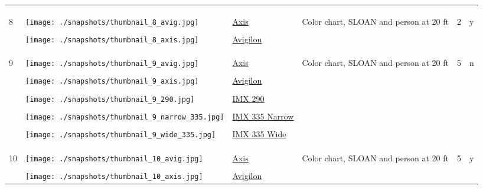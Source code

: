 \documentclass{article}%
\begin{document}
\begin{longtabu}{m{2.5cm} m{4cm} m{2cm} m{4cm} m{2cm} m{2cm}}
&&&&&\\%
&&&&&\\%
\hline%
&&&&&\\%
8&\texttt{[image: ./snapshots/thumbnail\_8\_avig.jpg]}&\href{https://drive.google.com/file/d/1dIMfIvu4PNXc4fBl0NWdB_pRMQ6uOnRl/view?usp=sharing}{Axis}&Color chart, SLOAN and person at 20 ft&2&y\\%
&&&&&\\%
&\texttt{[image: ./snapshots/thumbnail\_8\_axis.jpg]}&\href{https://drive.google.com/file/d/1CdmQ9ZqpQhFciiErRFA1oyzv_LDTw08f/view?usp=sharing}{Avigilon}&&&\\%
&&&&&\\%
&&&&&\\%
\hline%
&&&&&\\%
9&\texttt{[image: ./snapshots/thumbnail\_9\_avig.jpg]}&\href{https://drive.google.com/file/d/1-nkgyYF5XQGoX78rVhqMn-urWQTx7N5H/view?usp=sharing}{Axis}&Color chart, SLOAN and person at 20 ft&5&n\\%
&&&&&\\%
&\texttt{[image: ./snapshots/thumbnail\_9\_axis.jpg]}&\href{https://drive.google.com/file/d/1Wksqn2RFeL8PvKrpSK_-9BojnGTA-myy/view?usp=sharing}{Avigilon}&&&\\%
&&&&&\\%
&\texttt{[image: ./snapshots/thumbnail\_9\_290.jpg]}&\href{https://drive.google.com/file/d/17ozV-Gmt341mVcATrnqn1vQrTIJ5zGFD/view?usp=sharing}{IMX 290}&&&\\%
&&&&&\\%
&\texttt{[image: ./snapshots/thumbnail\_9\_narrow\_335.jpg]}&\href{https://drive.google.com/file/d/1XLKox52boq9CPdTEdJzQeL3ovW9pv7-0/view?usp=sharing}{IMX 335 Narrow}&&&\\%
&&&&&\\%
&\texttt{[image: ./snapshots/thumbnail\_9\_wide\_335.jpg]}&\href{https://drive.google.com/file/d/1JAG3ou_N4E42RGVmzAd49YMlXWBZ0w7z/view?usp=sharing}{IMX 335 Wide}&&&\\%
&&&&&\\%
&&&&&\\%
\hline%
&&&&&\\%
10&\texttt{[image: ./snapshots/thumbnail\_10\_avig.jpg]}&\href{https://drive.google.com/file/d/1nUAG04xCKvkZ-iGkHwqXTdi8gf36rWDZ/view?usp=sharing}{Axis}&Color chart, SLOAN and person at 20 ft&5&y\\%
&&&&&\\%
&\texttt{[image: ./snapshots/thumbnail\_10\_axis.jpg]}&\href{https://drive.google.com/file/d/1nabKrH0qS27BZH8De6vlP_IgS_janqi1/view?usp=sharing}{Avigilon}&&&\\%

\end{longtabu}
\end{document}
